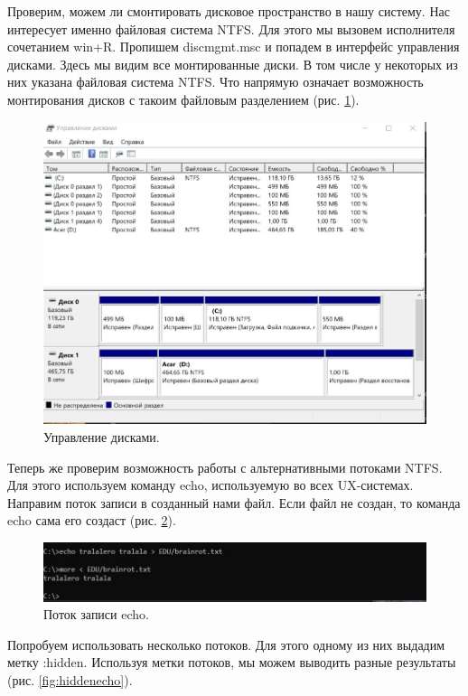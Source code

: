 Проверим, можем ли смонтировать дисковое пространство в нашу систему. Нас интересует именно файловая система NTFS. Для этого мы вызовем исполнителя сочетанием win+R. Пропишем discmgmt.msc и попадем в интерфейс управления дисками. Здесь мы видим все монтированные диски. В том числе у некоторых из них указана файловая система NTFS. Что напрямую означает возможность монтирования дисков с такоим файловым разделением (рис. \ref{fig:DiskManager}).

\begin{figure}
    \centering
    \includegraphics[width=0.5\linewidth]{Pic/lab2/photo_2025-05-21_21-19-25.jpg}
    \caption{Управление дисками.}
    \label{fig:DiskManager}
\end{figure}

Теперь же проверим возможность работы с альтернативными потоками NTFS. Для этого используем команду echo, используемую во всех UX-системах. Направим поток записи в созданный нами файл. Если файл не создан, то команда echo сама его создаст (рис. \ref{fig:echo}). 

\begin{figure}[h!]
    \centering
    \includegraphics[width=\linewidth]{Pic/lab2/photo_2025-05-21_21-19-27.jpg}
    \caption{Поток записи echo.}
    \label{fig:echo}
\end{figure}

Попробуем использовать несколько потоков. Для этого одному из них выдадим метку :hidden. Используя метки потоков, мы можем выводить разные результаты (рис. \ref{fig:hiddenecho}). 

